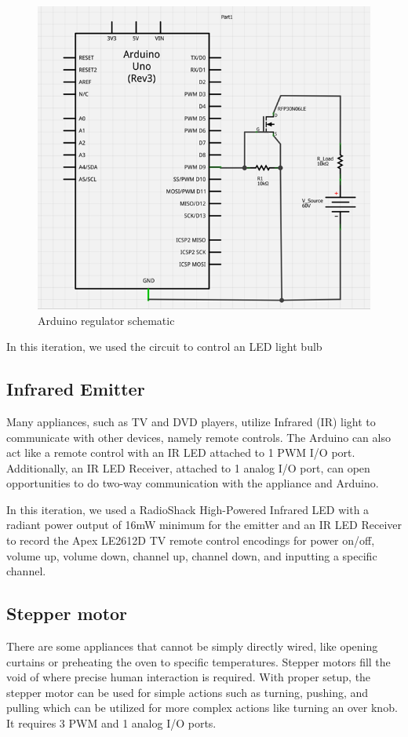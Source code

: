\documentclass{chi-ext}
\begin{document}
\begin{figure}
  \begin{center}
  \includegraphics[width=\linewidth]{schematic_2.png}
  \caption{Arduino regulator schematic}
  \label{fig:regulator}
  \end{center}  
\end{figure}


In this iteration, we used the circuit to control an LED light bulb

\subsection{Infrared Emitter}
Many appliances, such as TV and DVD players, utilize Infrared (IR) light to communicate with other devices, namely remote controls.
The Arduino can also act like a remote control with an IR LED attached to 1 PWM I/O port.
Additionally, an IR LED Receiver, attached to 1 analog I/O port, can open opportunities to do two-way communication with the appliance and Arduino. \cite{_how_to_tv}

In this iteration, we used a RadioShack High-Powered Infrared LED with a radiant power output of 16mW minimum for the emitter and an IR LED Receiver to record the Apex LE2612D TV remote control encodings for power on/off, volume up, volume down, channel up, channel down, and inputting a specific channel. 

\subsection{Stepper motor}
There are some appliances that cannot be simply directly wired, like opening curtains or preheating the oven to specific temperatures.
Stepper motors fill the void of where precise human interaction is required.
With proper setup, the stepper motor can be used for simple actions such as turning, pushing, and pulling which can be utilized for more complex actions like turning an over knob.
It requires 3 PWM and 1 analog I/O ports. \cite{_how_to_motors}
\end{document}
